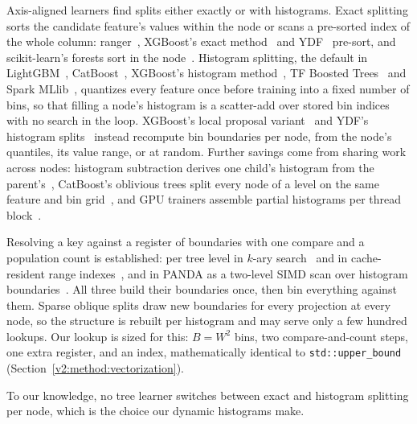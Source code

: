 \documentclass[sigconf,anonymous,review]{acmart}
\begin{document}
Axis-aligned learners find splits either exactly or with histograms. Exact splitting sorts the candidate feature's values within the node or scans a pre-sorted index of the whole column: ranger~\cite{wright2017ranger}, XGBoost's exact method~\cite{chen2016xgboost} and YDF~\cite{ydf} pre-sort, and scikit-learn's forests sort in the node~\cite{pedregosa2011scikit}. Histogram splitting, the default in LightGBM~\cite{ke2017lightgbm}, CatBoost~\cite{prokhorenkova2018catboost}, XGBoost's histogram method~\cite{chen2016xgboost}, TF Boosted Trees~\cite{ponomareva2017tf} and Spark MLlib~\cite{meng2016mllib}, quantizes every feature once before training into a fixed number of bins, so that filling a node's histogram is a scatter-add over stored bin indices with no search in the loop. XGBoost's local proposal variant~\cite{chen2016xgboost} and YDF's histogram splits~\cite{ydf} instead recompute bin boundaries per node, from the node's quantiles, its value range, or at random. Further savings come from sharing work across nodes: histogram subtraction derives one child's histogram from the parent's~\cite{ke2017lightgbm}, CatBoost's oblivious trees split every node of a level on the same feature and bin grid~\cite{prokhorenkova2018catboost}, and GPU trainers assemble partial histograms per thread block~\cite{wenthundergbm19,xu2025scalagbm}. 

Resolving a key against a register of boundaries with one compare and a population count is established: per tree level in $k$-ary search~\cite{schlegel2009k} and in cache-resident range indexes~\cite{polychroniou_comprehensive_2014}, and in PANDA as a two-level SIMD scan over histogram boundaries~\cite{patwary_panda_2016}. All three build their boundaries once, then bin everything against them. Sparse oblique splits draw new boundaries for every projection at every node, so the structure is rebuilt per histogram and may serve only a few hundred lookups. Our lookup is sized for this: $B = W^2$ bins, two compare-and-count steps, one extra register, and an index, mathematically identical to \texttt{std::upper\_bound} (Section~\ref{v2:method:vectorization}).

To our knowledge, no tree learner switches between exact and histogram splitting per node, which is the choice our dynamic histograms make.
\end{document}
